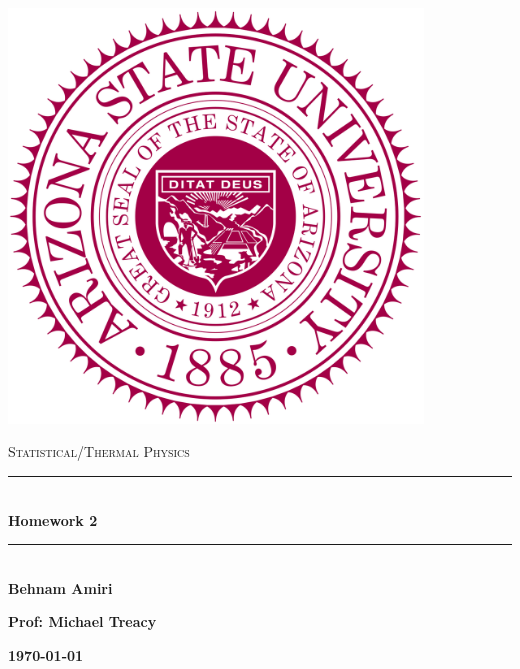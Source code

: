 \documentclass[fleqn]{article}
\begin{document}
  \begin{titlepage}

    \newcommand{\HRule}{\rule{\linewidth}{0.5mm}}

    \center

    \begin{center}
      \includegraphics[height=11cm, width=11cm]{asu.png}
    \end{center}

    \vline

    \textsc{\LARGE Statistical/Thermal Physics}\\[1.5cm]

    \HRule \\[0.5cm]
    { \huge \bfseries Homework 2}\\[0.4cm] 
    \HRule \\[1.0cm]

    \textbf{Behnam Amiri}

    \bigbreak

    \textbf{Prof: Michael Treacy}

    \bigbreak

    \textbf{{\large \today}\\[2cm]}

    \vfill

  \end{titlepage}
\end{document}

